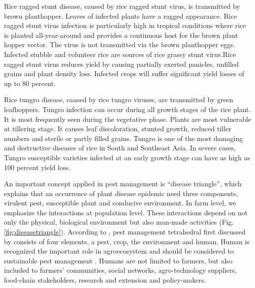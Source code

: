 Rice ragged stunt disease, caused by rice ragged stunt virus, is transmitted by brown planthopper. Leaves of infected plants have a ragged appearance. Rice ragged stunt virus infection is particularly high in tropical conditions where rice is planted all-year-around and provides a continuous host for the brown plant hopper vector. The virus is not transmitted via the brown planthopper eggs. Infected stubble and volunteer rice are sources of rice grassy stunt virus.Rice ragged stunt virus reduces yield by causing partially exerted panicles, unfilled grains and plant density loss. Infected crops will suffer significant yield losses of up to 80 percent.

Rice tungro disease, caused by rice tungro viruses, are transmitted by green leafhoppers. Tungro infection can occur during all growth stages of the rice plant. It is most frequently seen during the vegetative phase. Plants are most vulnerable at tillering stage. It causes leaf discoloration, stunted growth, reduced tiller numbers and sterile or partly filled grains. Tungro is one of the most damaging and destructive diseases of rice in South and Southeast Asia. In severe cases, Tungro susceptible varieties infected at an early growth stage can have as high as 100 percent yield loss.

An important concept applied in pest management is ``disease triangle'', which explains that an occurrence of plant disease epidemic need three components, virulent pest, susceptible plant and conducive environment. In farm level, we emphasize the interactions at population level. These interactions depend on not only the physical, biological environment but also man-made activities (Fig.\ref{fig:diseasetriangle}). According to \citet{Savary:2006to}, pest management tetrahedral first discussed by \cite{Zadoks:1979ts} consists of four elements, a pest, crop, the environment and human. Human is recognized the important role in agroecosystem and should be considered to sustainable pest management \citep{Zadok1985}. Humans are not limited to farmers, but also included to farmers' communities, social networks, agro-technology suppliers,  food-chain  stakeholders,  research  and extension and policy-makers.

